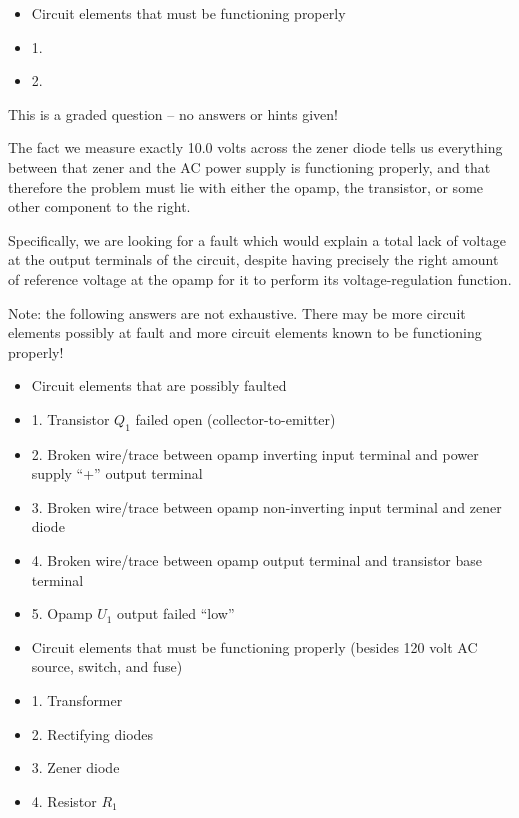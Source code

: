 \begin{itemize}
\goodbreak
\item{} Circuit elements that must be functioning properly
\item{1.} 
\item{2.} 
\end{itemize}

\vfil 

\eject






This is a graded question -- no answers or hints given!







The fact we measure exactly 10.0 volts across the zener diode tells us everything between that zener and the AC power supply is functioning properly, and that therefore the problem must lie with either the opamp, the transistor, or some other component to the right.

Specifically, we are looking for a fault which would explain a total lack of voltage at the output terminals of the circuit, despite having precisely the right amount of reference voltage at the opamp for it to perform its voltage-regulation function.

\vskip 10pt

Note: the following answers are not exhaustive.  There may be more circuit elements possibly at fault and more circuit elements known to be functioning properly!

\begin{itemize}
\goodbreak
\item{} Circuit elements that are possibly faulted
\item{1.} Transistor $Q_1$ failed open (collector-to-emitter)
\item{2.} Broken wire/trace between opamp inverting input terminal and power supply ``+'' output terminal
\item{3.} Broken wire/trace between opamp non-inverting input terminal and zener diode
\item{4.} Broken wire/trace between opamp output terminal and transistor base terminal
\item{5.} Opamp $U_1$ output failed ``low''
\end{itemize}

\begin{itemize}
\goodbreak
\item{} Circuit elements that must be functioning properly (besides 120 volt AC source, switch, and fuse)
\item{1.} Transformer
\item{2.} Rectifying diodes
\item{3.} Zener diode
\item{4.} Resistor $R_1$
\end{itemize}




